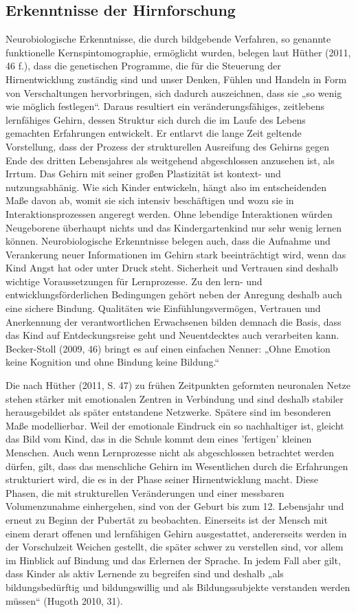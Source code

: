 \subsection{Erkenntnisse der Hirnforschung}
Neurobiologische Erkenntnisse, die durch bildgebende Verfahren, so genannte funktionelle Kernspintomographie, ermöglicht wurden,
belegen laut Hüther (2011, 46 f.), dass die genetischen Programme, die für die Steuerung der Hirnentwicklung zuständig sind und unser Denken, Fühlen und Handeln in Form von Verschaltungen hervorbringen, sich dadurch auszeichnen, dass sie „so wenig wie möglich festlegen“. Daraus resultiert ein veränderungsfähiges, zeitlebens lernfähiges Gehirn, dessen Struktur sich durch die im Laufe des Lebens gemachten Erfahrungen entwickelt. Er entlarvt die lange Zeit geltende Vorstellung, dass der Prozess der strukturellen Ausreifung des Gehirns gegen Ende des dritten Lebensjahres als weitgehend abgeschlossen anzusehen ist, als Irrtum. Das Gehirn mit seiner großen Plastizität ist kontext- und nutzungsabhänig. Wie sich Kinder entwickeln, hängt also im entscheidenden Maße davon ab, womit sie sich intensiv beschäftigen und wozu sie in Interaktionsprozessen angeregt werden. Ohne lebendige Interaktionen würden Neugeborene überhaupt nichts und das Kindergartenkind nur sehr wenig lernen können. Neurobiologische Erkenntnisse belegen auch, dass die Aufnahme und Verankerung neuer Informationen im Gehirn stark beeinträchtigt wird, wenn das Kind Angst hat oder unter Druck steht. Sicherheit und Vertrauen sind deshalb wichtige Voraussetzungen für Lernprozesse. Zu den lern- und entwicklungsförderlichen Bedingungen gehört neben der Anregung deshalb 
auch eine sichere Bindung. Qualitäten wie Einfühlungsvermögen, Vertrauen und Anerkennung der verantwortlichen Erwachsenen bilden demnach die Basis, dass das Kind auf Entdeckungsreise geht und Neuentdecktes auch verarbeiten kann.
Becker-Stoll (2009, 46) bringt es auf einen einfachen Nenner: „Ohne Emotion keine Kognition und ohne Bindung keine Bildung.“

Die nach Hüther (2011, S. 47) zu frühen Zeitpunkten geformten neuronalen Netze stehen stärker mit emotionalen Zentren in Verbindung und sind deshalb stabiler herausgebildet als später entstandene Netzwerke. Spätere sind im besonderen Maße modellierbar.
 Weil der emotionale Eindruck ein so nachhaltiger ist, gleicht das Bild vom Kind, das in die Schule kommt dem eines 'fertigen' kleinen Menschen. Auch wenn Lernprozesse nicht als abgeschlossen betrachtet werden dürfen, gilt, dass das menschliche Gehirn im Wesentlichen durch die Erfahrungen strukturiert wird, die es in der Phase seiner Hirnentwicklung macht. 
Diese Phasen, die mit strukturellen Veränderungen und einer messbaren Volumenzunahme einhergehen, sind von der Geburt bis zum 12. Lebensjahr und erneut zu Beginn der Pubertät zu beobachten. 
Einerseits ist der Mensch mit einem derart offenen und lernfähigen Gehirn ausgestattet, andererseits werden in der Vorschulzeit Weichen gestellt, die später schwer zu verstellen sind, vor allem im Hinblick auf Bindung und das Erlernen der Sprache.
In jedem Fall aber gilt, dass Kinder als aktiv Lernende zu begreifen sind und deshalb „als bildungsbedürftig und bildungswillig und als Bildungssubjekte verstanden werden müssen“ (Hugoth 2010, 31).
 

